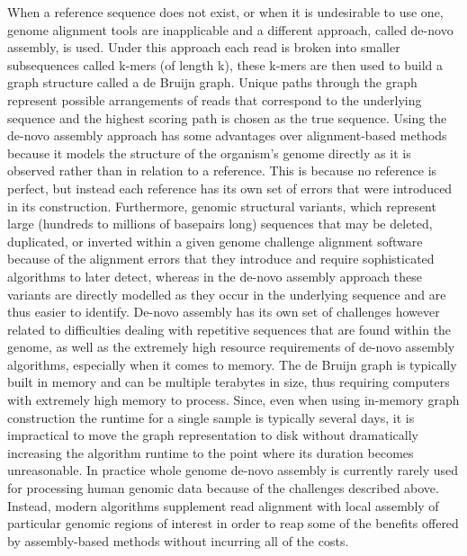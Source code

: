 When a reference sequence does not exist, or when it is undesirable to use one, genome alignment tools are inapplicable and a different approach, called de-novo assembly, is used\autocite{chaisson2015genetic}. Under this approach each read is broken into smaller subsequences called k-mers (of length k), these k-mers are then used to build a graph structure called a de Bruijn graph\autocite{de1946combinatorial}. Unique paths through the graph represent possible arrangements of reads that correspond to the underlying sequence and the highest scoring path is chosen as the true sequence. Using the de-novo assembly approach has some advantages over alignment-based methods because it models the structure of the organism's genome directly as it is observed rather than in relation to a reference. This is because no reference is perfect, but instead each reference has its own set of errors that were introduced in its construction. Furthermore, genomic structural variants, which represent large (hundreds to millions of basepairs long) sequences that may be deleted, duplicated, or inverted within a given genome challenge alignment software because of the alignment errors that they introduce and require sophisticated algorithms to later detect, whereas in the de-novo assembly approach these variants are directly modelled as they occur in the underlying sequence and are thus easier to identify. De-novo assembly has its own set of challenges however related to difficulties dealing with repetitive sequences that are found within the genome, as well as the extremely high resource requirements of de-novo assembly algorithms, especially when it comes to memory. The de Bruijn graph is typically built in memory and can be multiple terabytes in size, thus requiring computers with extremely high memory to process. Since, even when using in-memory graph construction the runtime for a single sample is typically several days, it is impractical to move the graph representation to disk without dramatically increasing the algorithm runtime to the point where its duration becomes unreasonable. In practice whole genome de-novo assembly is currently rarely used for processing human genomic data because of the challenges described above. Instead, modern algorithms supplement read alignment with local assembly of particular genomic regions of interest in order to reap some of the benefits offered by assembly-based methods without incurring all of the costs. 

